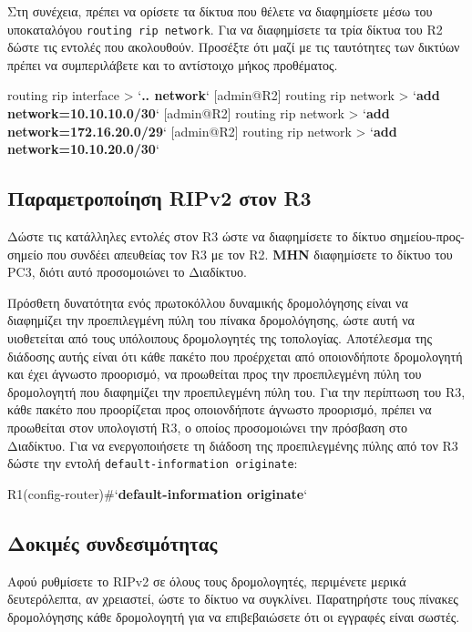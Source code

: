 \documentclass{EdipyLabs} %
\begin{document}
Στη συνέχεια, πρέπει να ορίσετε τα δίκτυα που θέλετε να διαφημίσετε μέσω του υποκαταλόγου \texttt{routing rip network}. Για να διαφημίσετε τα τρία δίκτυα του R2 δώστε τις εντολές που ακολουθούν. Προσέξτε ότι μαζί με τις ταυτότητες των δικτύων πρέπει να συμπεριλάβετε και το αντίστοιχο μήκος προθέματος.

\begin{CommandBox}
[admin@R2] routing rip interface > `\textbf{.. network}`
[admin@R2] routing rip network > `\textbf{add network=10.10.10.0/30}`
[admin@R2] routing rip network > `\textbf{add network=172.16.20.0/29}`
[admin@R2] routing rip network > `\textbf{add network=10.10.20.0/30}`
\end{CommandBox}

\subsection{Παραμετροποίηση RIPv2 στον R3}
Δώστε τις κατάλληλες εντολές στον R3 ώστε να διαφημίσετε το δίκτυο σημείου-προς-σημείο που συνδέει απευθείας τον R3 με τον R2. \textbf{MHN} διαφημίσετε το δίκτυο του PC3, διότι αυτό προσομοιώνει το Διαδίκτυο.

Πρόσθετη δυνατότητα ενός πρωτοκόλλου δυναμικής δρομολόγησης είναι να διαφημίζει την προεπιλεγμένη πύλη του πίνακα δρομολόγησης, ώστε αυτή να υιοθετείται από τους υπόλοιπους δρομολογητές της τοπολογίας. 
Αποτέλεσμα της διάδοσης αυτής είναι ότι κάθε πακέτο που προέρχεται από οποιονδήποτε δρομολογητή και έχει άγνωστο προορισμό, να προωθείται προς την προεπιλεγμένη πύλη του δρομολογητή που διαφημίζει την προεπιλεγμένη πύλη του. Για την περίπτωση του R3, κάθε πακέτο που προορίζεται προς οποιονδήποτε άγνωστο προορισμό, πρέπει να προωθείται στον υπολογιστή R3, ο οποίος προσομοιώνει την πρόσβαση στο Διαδίκτυο. Για να ενεργοποιήσετε τη διάδοση της προεπιλεγμένης πύλης από τον R3 δώστε την εντολή \texttt{default-information originate}:

\begin{CommandBox}
R1(config-router)#`\textbf{default-information originate}`
\end{CommandBox}

\subsection{Δοκιμές συνδεσιμότητας}
Αφού ρυθμίσετε το RIPv2 σε όλους τους δρομολογητές, περιμένετε μερικά δευτερόλεπτα, αν χρειαστεί, ώστε το δίκτυο να συγκλίνει. Παρατηρήστε τους πίνακες δρομολόγησης κάθε δρομολογητή για να επιβεβαιώσετε ότι οι εγγραφές είναι σωστές. 
\end{document}
